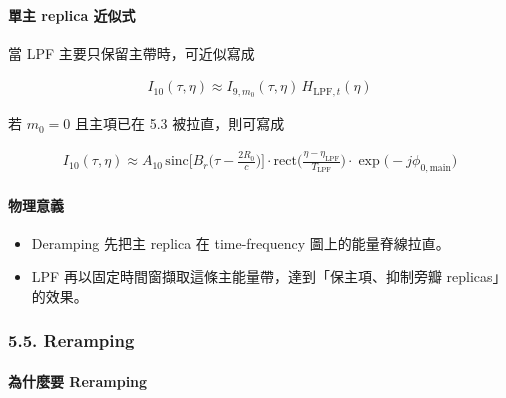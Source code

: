 \documentclass[10pt]{article}
\providecommand{\tightlist}{%
  \setlength{\itemsep}{0pt}\setlength{\parskip}{0pt}}
\begin{document}
\hypertarget{ux55aeux4e3b-replica-ux8fd1ux4f3cux5f0f}{%
\paragraph{單主 replica
近似式}\label{ux55aeux4e3b-replica-ux8fd1ux4f3cux5f0f}}

當 LPF 主要只保留主帶時，可近似寫成

\begin{equation}
\begin{aligned}
I_{10}(\tau,\eta)\approx I_{9,m_0}(\tau,\eta)\,H_{\mathrm{LPF},t}(\eta)
\end{aligned}
\end{equation}

若 \(m_0=0\) 且主項已在 5.3 被拉直，則可寫成

\begin{equation}
\begin{aligned}
I_{10}(\tau,\eta)\approx A_{10}\,
\mathrm{sinc}\biggl[ B_r\biggl( \tau-\frac{2R_0}{c} \biggr) \biggr]\cdot
\mathrm{rect}\biggl( \frac{\eta-\eta_{\mathrm{LPF}}}{T_{\mathrm{LPF}}} \biggr)\cdot
\exp\biggl( -j\phi_{0,\mathrm{main}} \biggr)
\end{aligned}
\end{equation}

\hypertarget{ux7269ux7406ux610fux7fa9}{%
\paragraph{物理意義}\label{ux7269ux7406ux610fux7fa9}}

\begin{itemize}
\tightlist
\item
  Deramping 先把主 replica 在 time-frequency 圖上的能量脊線拉直。
\item
  LPF 再以固定時間窗擷取這條主能量帶，達到「保主項、抑制旁瓣
  replicas」的效果。
\end{itemize}

\hypertarget{reramping-1}{%
\subsubsection{5.5. Reramping}\label{reramping-1}}

\hypertarget{ux70baux4ec0ux9ebcux8981-reramping-1}{%
\paragraph{為什麼要
Reramping}\label{ux70baux4ec0ux9ebcux8981-reramping-1}}
\end{document}

